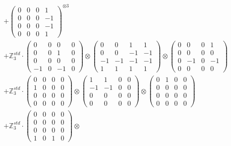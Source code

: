 \documentclass{article}
\begin{document}
{\begin{align}
        &+ \label{Rs16-Rc11-Strassen-1-c16} \begin{pmatrix} 0 & 0 & 0 & 1 \\ 0 & 0 & 0 & -1 \\ 0 & 0 & 0 & -1 \\ 0 & 0 & 0 & 1 \end{pmatrix}^{\otimes 3} \\
        &+ \label{Rs16-Rc11-Strassen-1-c17} \mathbb{Z}_3^{std} \cdot 
            \begin{pmatrix} 0 & 0 & 0 & 0 \\ 0 & 0 & 1 & 0 \\ 0 & 0 & 0 & 0 \\ -1 & 0 & -1 & 0 \end{pmatrix} \otimes 
            \begin{pmatrix} 0 & 0 & 1 & 1 \\ 0 & 0 & -1 & -1 \\ -1 & -1 & -1 & -1 \\ 1 & 1 & 1 & 1 \end{pmatrix} \otimes 
            \begin{pmatrix} 0 & 0 & 0 & 1 \\ 0 & 0 & 0 & 0 \\ 0 & -1 & 0 & -1 \\ 0 & 0 & 0 & 0 \end{pmatrix} \\ 
        &+ \label{Rs16-Rc11-Strassen-1-c18} \mathbb{Z}_3^{std} \cdot 
            \begin{pmatrix} 0 & 0 & 0 & 0 \\ 1 & 0 & 0 & 0 \\ 0 & 0 & 0 & 0 \\ 0 & 0 & 0 & 0 \end{pmatrix} \otimes 
            \begin{pmatrix} 1 & 1 & 0 & 0 \\ -1 & -1 & 0 & 0 \\ 0 & 0 & 0 & 0 \\ 0 & 0 & 0 & 0 \end{pmatrix} \otimes 
            \begin{pmatrix} 0 & 1 & 0 & 0 \\ 0 & 0 & 0 & 0 \\ 0 & 0 & 0 & 0 \\ 0 & 0 & 0 & 0 \end{pmatrix} \\ 
        &+ \label{Rs16-Rc11-Strassen-1-c19} \mathbb{Z}_3^{std} \cdot 
            \begin{pmatrix} 0 & 0 & 0 & 0 \\ 0 & 0 & 0 & 0 \\ 0 & 0 & 0 & 0 \\ 1 & 0 & 1 & 0 \end{pmatrix} \otimes 

\end{align}}
\end{document}

